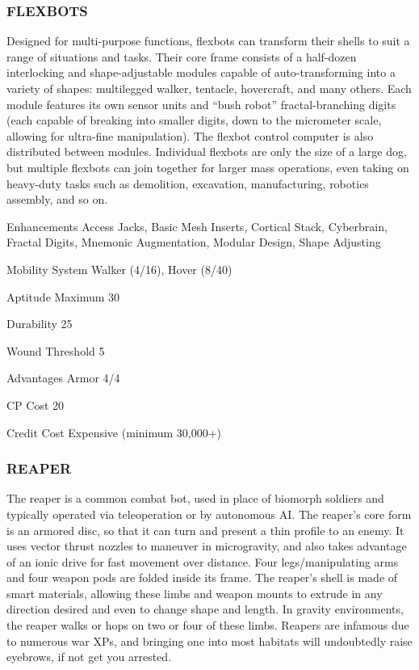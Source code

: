 \subsubsection{FLEXBOTS}
Designed for multi-purpose functions, flexbots can transform their shells to
suit a range of situations and tasks. Their core frame consists of a half-dozen
interlocking and shape-adjustable modules capable of auto-transforming into a
variety of shapes: multilegged walker, tentacle, hovercraft, and many others.
Each module features its own sensor units and “bush robot” fractal-branching
digits (each capable of breaking into smaller digits, down to the micrometer
scale, allowing for ultra-fine manipulation). The flexbot control computer is
also distributed between modules.  Individual flexbots are only the size of a
large dog, but multiple flexbots can join together for larger mass operations,
even taking on heavy-duty tasks such as demolition, excavation, manufacturing,
robotics assembly, and so on.

\begin{description*}
\item[Enhancements] Access Jacks, Basic Mesh Inserts, Cortical Stack,
  Cyberbrain, Fractal Digits, Mnemonic Augmentation, Modular Design, Shape
  Adjusting
\item[Mobility System]  Walker (4/16), Hover (8/40) 
\item[Aptitude Maximum]  30 
\item[Durability]  25 
\item[Wound Threshold]  5 
\item[Advantages]  Armor 4/4 
\item[CP Cost]  20 
\item[Credit Cost] Expensive (minimum 30,000+)
\end{description*}

\subsubsection{REAPER}
The reaper is a common combat bot, used in place of biomorph soldiers and
typically operated via teleoperation or by autonomous AI. The reaper’s core
form is an armored disc, so that it can turn and present a thin profile to an
enemy. It uses vector thrust nozzles to maneuver in microgravity, and also
takes advantage of an ionic drive for fast movement over distance.  Four
legs/manipulating arms and four weapon pods are folded inside its frame. The
reaper’s shell is made of smart materials, allowing these limbs and weapon
mounts to extrude in any direction desired and even to change shape and
length. In gravity environments, the reaper walks or hops on two or four of
these limbs.  Reapers are infamous due to numerous war XPs, and bringing one
into most habitats will undoubtedly raise eyebrows, if not get you arrested.

